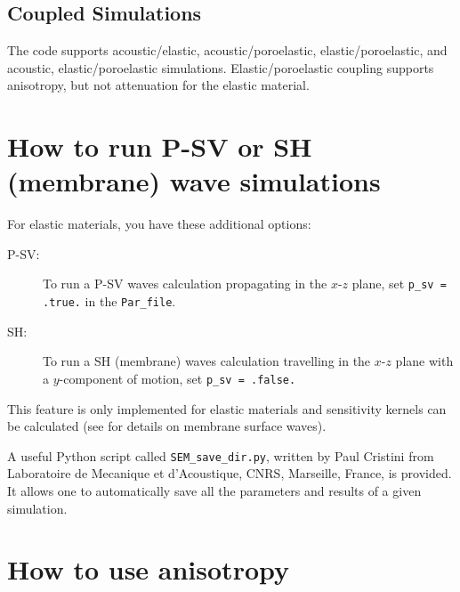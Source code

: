 \documentclass[oneside,english,onecolumn,letterpaper]{book}
\begin{document}
\subsection*{Coupled Simulations}

The code supports acoustic/elastic, acoustic/poroelastic, elastic/poroelastic,
and acoustic, elastic/poroelastic simulations.
Elastic/poroelastic coupling supports anisotropy, but not attenuation for the
elastic material.


\section{How to run P-SV or SH (membrane) wave simulations}

For elastic materials, you have these additional options:
%
\begin{description}
\item[P-SV:]
To run a P-SV waves calculation propagating in the $x$-$z$ plane,
set \texttt{p\_sv = .true.} in the \texttt{Par\_file}.

\item[SH:]
To run a SH (membrane) waves calculation travelling in the $x$-$z$ plane with a
$y$-component of motion, set \texttt{p\_sv = .false.}

\end{description}
%
This feature is only implemented for elastic materials and sensitivity kernels
can be calculated (see \cite{TaLiTr07} for details on membrane
surface waves).

A useful Python script called \texttt{SEM\_save\_dir.py}, written by Paul Cristini from
Laboratoire de Mecanique et d'Acoustique, CNRS, Marseille, France, is provided.
It allows one to automatically save all the parameters and results of a given simulation.

\section{How to use anisotropy}
\end{document}
